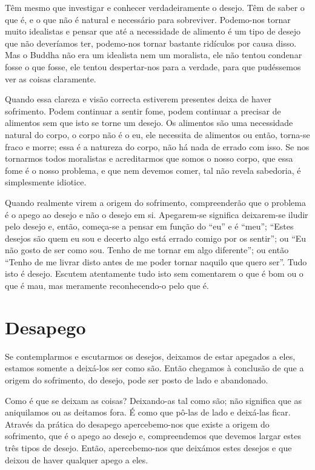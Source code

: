 Têm mesmo que investigar e conhecer verdadeiramente o desejo. Têm de saber o que
é, e o que não é natural e necessário para sobreviver. Podemo-nos tornar muito
idealistas e pensar que até a necessidade de alimento é um tipo de desejo que
não deveríamos ter, podemo-nos tornar bastante ridículos por causa disso. Mas o
Buddha não era um idealista nem um moralista, ele não tentou condenar fosse o
que fosse, ele tentou despertar-nos para a verdade, para que pudéssemos ver as
coisas claramente.

Quando essa clareza e visão correcta estiverem presentes deixa de haver
sofrimento. Podem continuar a sentir fome, podem continuar a precisar de
alimentos sem que isto se torne um desejo. Os alimentos são uma necessidade
natural do corpo, o corpo não é o eu, ele necessita de alimentos ou então,
torna-se fraco e morre; essa é a natureza do corpo, não há nada de errado com
isso. Se nos tornarmos todos moralistas e acreditarmos que somos o nosso corpo,
que essa fome é o nosso problema, e que nem devemos comer, tal não revela
sabedoria, é simplesmente idiotice.

Quando realmente virem a origem do sofrimento, compreenderão que o problema é o
apego ao desejo e não o desejo em si. Apegarem-se significa deixarem-se iludir
pelo desejo e, então, começa-se a pensar em função do “eu” e é “meu”; “Estes
desejos são quem eu sou e decerto algo está errado comigo por os sentir”; ou “Eu
não gosto de ser como sou. Tenho de me tornar em algo diferente”; ou então
“Tenho de me livrar disto antes de me poder tornar naquilo que quero ser”. Tudo
isto é desejo. Escutem atentamente tudo isto sem comentarem o que é bom ou o que
é mau, mas meramente reconhecendo-o pelo que é.

\section{Desapego}

Se contemplarmos e escutarmos os desejos, deixamos de estar apegados a eles,
estamos somente a deixá-los ser como são. Então chegamos à conclusão de que a
origem do sofrimento, do desejo, pode ser posto de lado e abandonado.

Como é que se deixam as coisas? Deixando-as tal como são; não significa que as
aniquilamos ou as deitamos fora. É como que pô-las de lado e deixá-las ficar.
Através da prática do desapego apercebemo-nos que existe a origem do sofrimento,
que é o apego ao desejo e, compreendemos que devemos largar estes três tipos de
desejo. Então, apercebemo-nos que deixámos estes desejos e que deixou de haver
qualquer apego a eles.

